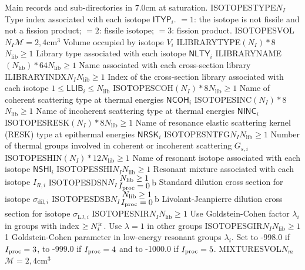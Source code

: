 \begin{DescriptionEnregistrement}{Main records and sub-directories in }{7.0cm}
{  at saturation.}
\IntEnr
  {ISOTOPESTYPE}{$N_{I}$}
  {Type index associated with each isotope $\mathsf{ITYP}_{i}$. $=1$: the isotope is
  not fissile and not a fission product; $=2$: fissile isotope; $=3$: fission
  product.}
\OptRealEnr
  {ISOTOPESVOL}{$N_{I}$}{$\mathcal{M}=2, 4$}{cm$^{3}$}
  {Volume occupied by isotope $V_{i}$}
\OptCharEnr
  {ILIBRARYTYPE}{$(N_{I})*8$}{$N_{\mathrm{lib}}\ge 1$}
  {Library type associated with each isotope $\mathsf{NLTY}_{i}$}
\OptCharEnr
  {ILIBRARYNAME}{$(N_{\mathrm{lib}})*64$}{$N_{\mathrm{lib}}\ge 1$}
  {Name associated with each cross-section library}
\OptIntEnr
  {ILIBRARYINDX}{$N_{I}$}{$N_{\mathrm{lib}}\ge 1$}
  {Index of the cross-section library associated with each isotope $1 \le \mathsf{LLIB}_{i}\le N_{\mathrm{lib}}$}
\OptCharEnr
  {ISOTOPESCOH}{$(N_{I})*8$}{$N_{\mathrm{lib}}\ge 1$}
  {Name of coherent scattering type at thermal energies $\mathsf{NCOH}_{i}$}
\OptCharEnr
  {ISOTOPESINC}{$(N_{I})*8$}{$N_{\mathrm{lib}}\ge 1$}
  {Name of incoherent scattering type at thermal energies $\mathsf{NINC}_{i}$}
\OptCharEnr
  {ISOTOPESRESK}{$(N_{I})*8$}{$N_{\mathrm{lib}}\ge 1$}
  {Name of resonance elastic scattering kernel (RESK) type at epithermal energies $\mathsf{NRSK}_{i}$}
\OptIntEnr
  {ISOTOPESNTFG}{$N_{I}$}{$N_{\mathrm{lib}}\ge 1$}
  {Number of thermal groups involved in coherent or incoherent scattering $G_{s,i}$}
\OptCharEnr
  {ISOTOPESHIN}{$(N_{I})*12$}{$N_{\mathrm{lib}}\ge 1$}
  {Name of resonant isotope associated with each isotope $\mathsf{NSHI}_{i}$}
\OptIntEnr
  {ISOTOPESSHI}{$N_{I}$}{$N_{\mathrm{lib}}\ge 1$}
  {Resonant mixture associated with each isotope $I_{R,i}$}
\OptRealEnr
  {ISOTOPESDSN}{$N_{I}$}{${\displaystyle N_{\mathrm{lib}}\ge 1 \atop
  \displaystyle I_{\rm proc}=0}$}{b}
  {Standard dilution cross section for isotope $\sigma_{\mathrm{dil},i}$}
\OptRealEnr
  {ISOTOPESDSB}{$N_{I}$}{${\displaystyle N_{\mathrm{lib}}\ge 1 \atop
  \displaystyle I_{\rm proc}=0}$}{b}
  {Livolant-Jeanpierre dilution cross section for isotope $\sigma_{\mathrm{LJ},i}$}
\OptIntEnr
  {ISOTOPESNIR}{$N_{I}$}{$N_{\mathrm{lib}}\ge 1$}
  {Use Goldstein-Cohen factor $\lambda_i$ in groups with index $\ge N^{\rm ir}_i$.
  Use $\lambda=1$ in other groups}
\OptRealEnr
  {ISOTOPESGIR}{$N_{I}$}{$N_{\mathrm{lib}}\ge 1$}{1}
  {Goldstein-Cohen parameter in low-energy resonant groups $\lambda_i$. Set to -998.0 if
  $I_{\rm proc}=3$, to -999.0 if $I_{\rm proc}=4$ and to -1000.0 if $I_{\rm proc}=5$.}
\OptRealEnr
  {MIXTURESVOL}{$N_{m}$}{$\mathcal{M}=2, 4$}{cm$^{3}$}

\end{DescriptionEnregistrement}

